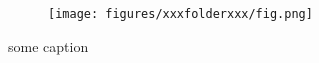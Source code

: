 \begin{figure}[bt]
\centering

\begin{subfigure}{0.49\textwidth}
    \centering
    \texttt{[image: figures/xxxfolderxxx/fig.png]}
\end{subfigure}

    \caption{some caption
    \label{fig:short}}

\end{figure}    

